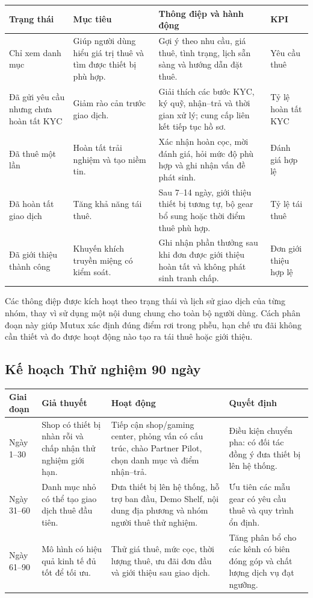 \begin{longtable}{@{}p{}p{}p{}p{}@{}}
\toprule
\textbf{Trạng thái} & \textbf{Mục tiêu} & \textbf{Thông điệp và hành động} & \textbf{KPI} \\
\midrule
\endhead
Chỉ xem danh mục & Giúp người dùng hiểu giá trị thuê và tìm được thiết bị phù hợp. & Gợi ý theo nhu cầu, giá thuê, tình trạng, lịch sẵn sàng và hướng dẫn đặt thuê. & Yêu cầu thuê \\
Đã gửi yêu cầu nhưng chưa hoàn tất KYC & Giảm rào cản trước giao dịch. & Giải thích các bước KYC, ký quỹ, nhận--trả và thời gian xử lý; cung cấp liên kết tiếp tục hồ sơ. & Tỷ lệ hoàn tất KYC \\
Đã thuê một lần & Hoàn tất trải nghiệm và tạo niềm tin. & Xác nhận hoàn cọc, mời đánh giá, hỏi mức độ phù hợp và ghi nhận vấn đề phát sinh. & Đánh giá hợp lệ \\
Đã hoàn tất giao dịch & Tăng khả năng tái thuê. & Sau 7--14 ngày, giới thiệu thiết bị tương tự, bộ gear bổ sung hoặc thời điểm thuê phù hợp. & Tỷ lệ tái thuê \\
Đã giới thiệu thành công & Khuyến khích truyền miệng có kiểm soát. & Ghi nhận phần thưởng sau khi đơn được giới thiệu hoàn tất và không phát sinh tranh chấp. & Đơn giới thiệu hợp lệ \\
\bottomrule
\end{longtable}

Các thông điệp được kích hoạt theo trạng thái và lịch sử giao dịch của từng nhóm, thay vì sử dụng một nội dung chung cho toàn bộ người dùng. Cách phân đoạn này giúp Mutux xác định đúng điểm rơi trong phễu, hạn chế ưu đãi không cần thiết và đo được hoạt động nào tạo ra tái thuê hoặc giới thiệu.

\subsection{Kế hoạch Thử nghiệm 90 ngày}

\begin{longtable}{@{}p{}p{}p{}p{}@{}}
\toprule
\textbf{Giai đoạn} & \textbf{Giả thuyết} & \textbf{Hoạt động} & \textbf{Quyết định} \\
\midrule
\endhead
Ngày 1--30 & Shop có thiết bị nhàn rỗi và chấp nhận thử nghiệm giới hạn. & Tiếp cận shop/gaming center, phỏng vấn có cấu trúc, chào Partner Pilot, chọn danh mục và điểm nhận--trả. & Điều kiện chuyển pha: có đối tác đồng ý đưa thiết bị lên hệ thống. \\
Ngày 31--60 & Danh mục nhỏ có thể tạo giao dịch thuê đầu tiên. & Đưa thiết bị lên hệ thống, hỗ trợ ban đầu, Demo Shelf, nội dung địa phương và nhóm người thuê thử nghiệm. & Ưu tiên các mẫu gear có yêu cầu thuê và quy trình ổn định. \\
Ngày 61--90 & Mô hình có hiệu quả kinh tế đủ tốt để tối ưu. & Thử giá thuê, mức cọc, thời lượng thuê, ưu đãi đơn đầu và giới thiệu sau giao dịch. & Tăng phân bổ cho các kênh có biên đóng góp và chất lượng dịch vụ đạt ngưỡng. \\
\bottomrule
\end{longtable}

